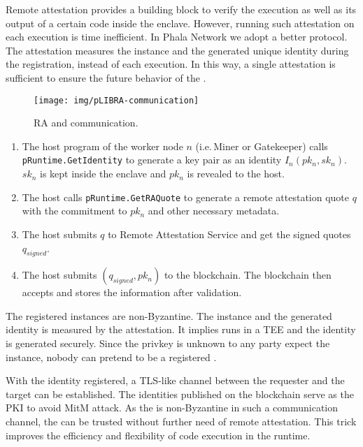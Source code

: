 Remote attestation provides a building block to verify the execution as well as its output of a certain code inside the enclave. However, running such attestation on each execution is time inefficient. In Phala Network we adopt a better protocol. The attestation measures the \pruntime instance and the generated unique identity during the registration, instead of each execution. In this way, a single attestation is sufficient to ensure the future behavior of the \pruntime.

\begin{figure}
    \centering \footnotesize
    \texttt{[image: img/pLIBRA-communication]}
    \caption{RA and communication.}
    \label{fig:communication}
\end{figure}

\begin{enumerate}
    \item The host program of the worker node $n$ (i.e.\,Miner or Gatekeeper) calls \texttt{pRuntime.GetIdentity} to generate a key pair as an identity $I_n(pk_n, sk_n)$.  $sk_n$ is kept inside the enclave and $pk_n$ is revealed to the host.

    \item The host calls \texttt{pRuntime.GetRAQuote} to generate a remote attestation quote $q$ with the commitment to $pk_n$ and other necessary metadata.

    \item The host submits $q$ to Remote Attestation Service and get the signed quotes $q_{signed}$.

    \item The host submits $(q_{signed}, pk_n)$ to the blockchain. The blockchain then accepts and stores the information after validation.
\end{enumerate}

The registered \pruntime instances are non-Byzantine. The \pruntime instance and the generated identity is measured by the attestation. It implies \pruntime runs in a TEE and the identity is generated securely. Since the privkey is unknown to any party expect the instance, nobody can pretend to be a registered \pruntime.

With the identity registered, a TLS-like channel between the requester and the target \pruntime can be established. The identities published on the blockchain serve as the PKI to avoid MitM attack. As the \pruntime is non-Byzantine in such a communication channel, the \pruntime can be trusted without further need of remote attestation.  This trick improves the efficiency and flexibility of code execution in the runtime.

